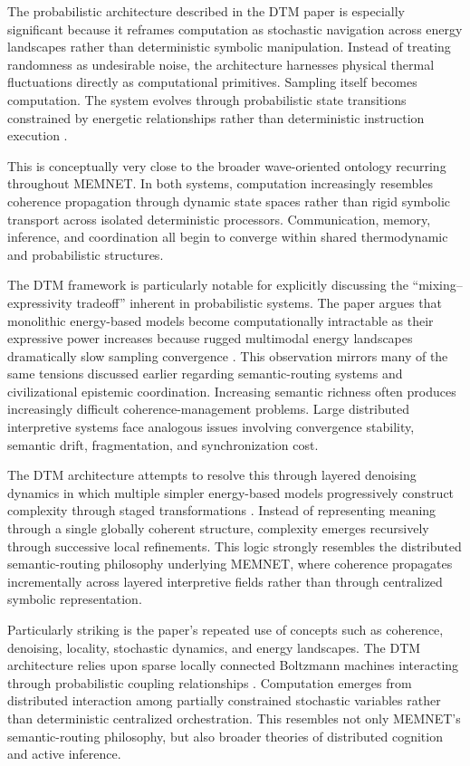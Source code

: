 \documentclass[11pt,a4paper]{article}
\begin{document}
The probabilistic architecture described in the DTM paper is especially significant because it reframes computation as stochastic navigation across energy landscapes rather than deterministic symbolic manipulation. Instead of treating randomness as undesirable noise, the architecture harnesses physical thermal fluctuations directly as computational primitives. Sampling itself becomes computation. The system evolves through probabilistic state transitions constrained by energetic relationships rather than deterministic instruction execution \cite{jelincic2025}.

This is conceptually very close to the broader wave-oriented ontology recurring throughout MEMNET. In both systems, computation increasingly resembles coherence propagation through dynamic state spaces rather than rigid symbolic transport across isolated deterministic processors. Communication, memory, inference, and coordination all begin to converge within shared thermodynamic and probabilistic structures.

The DTM framework is particularly notable for explicitly discussing the ``mixing--expressivity tradeoff'' inherent in probabilistic systems. The paper argues that monolithic energy-based models become computationally intractable as their expressive power increases because rugged multimodal energy landscapes dramatically slow sampling convergence \cite{jelincic2025}. This observation mirrors many of the same tensions discussed earlier regarding semantic-routing systems and civilizational epistemic coordination. Increasing semantic richness often produces increasingly difficult coherence-management problems. Large distributed interpretive systems face analogous issues involving convergence stability, semantic drift, fragmentation, and synchronization cost.

The DTM architecture attempts to resolve this through layered denoising dynamics in which multiple simpler energy-based models progressively construct complexity through staged transformations \cite{jelincic2025}. Instead of representing meaning through a single globally coherent structure, complexity emerges recursively through successive local refinements. This logic strongly resembles the distributed semantic-routing philosophy underlying MEMNET, where coherence propagates incrementally across layered interpretive fields rather than through centralized symbolic representation.

Particularly striking is the paper's repeated use of concepts such as coherence, denoising, locality, stochastic dynamics, and energy landscapes. The DTM architecture relies upon sparse locally connected Boltzmann machines interacting through probabilistic coupling relationships \cite{jelincic2025}. Computation emerges from distributed interaction among partially constrained stochastic variables rather than deterministic centralized orchestration. This resembles not only MEMNET's semantic-routing philosophy, but also broader theories of distributed cognition and active inference.
\end{document}
